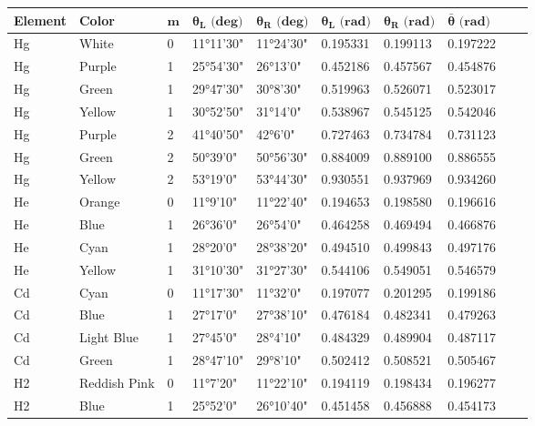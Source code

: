\documentclass[a4paper,11pt]{article}
\begin{document}
\begin{table}[H]
  \centering
  \begin{tabular}{llllllllll}
  \toprule
  \textbf{Element} & \textbf{Color} & \(\boldsymbol{m}\) & \(\boldsymbol{\theta_L \text{ (deg)}}\) & \(\boldsymbol{\theta_R \text{ (deg)}}\) & \(\boldsymbol{\theta_L \text{ (rad)}}\) & \(\boldsymbol{\theta_R \text{ (rad)}}\) & \(\boldsymbol{\bar \theta \text{ (rad)}}\) \\
  \midrule
  Hg  & White        & 0 & 11°11'30" & 11°24'30"  & 0.195331 & 0.199113 & 0.197222 \\
  Hg  & Purple       & 1 & 25°54'30" & 26°13'0"   & 0.452186 & 0.457567 & 0.454876 \\
  Hg  & Green        & 1 & 29°47'30" & 30°8'30"   & 0.519963 & 0.526071 & 0.523017 \\
  Hg  & Yellow       & 1 & 30°52'50" & 31°14'0"   & 0.538967 & 0.545125 & 0.542046 \\
  Hg  & Purple       & 2 & 41°40'50" & 42°6'0"    & 0.727463 & 0.734784 & 0.731123 \\
  Hg  & Green        & 2 & 50°39'0"  & 50°56'30"  & 0.884009 & 0.889100 & 0.886555 \\
  Hg  & Yellow       & 2 & 53°19'0"  & 53°44'30"  & 0.930551 & 0.937969 & 0.934260 \\
  \hline
  He  & Orange       & 0 & 11°9'10"  & 11°22'40"  & 0.194653 & 0.198580 & 0.196616 \\
  He  & Blue       & 1 & 26°36'0"  & 26°54'0"   & 0.464258 & 0.469494 & 0.466876 \\
  He  & Cyan        & 1 & 28°20'0"  & 28°38'20"  & 0.494510 & 0.499843 & 0.497176 \\
  He  & Yellow       & 1 & 31°10'30" & 31°27'30"  & 0.544106 & 0.549051 & 0.546579 \\
  \hline
  Cd  & Cyan        & 0 & 11°17'30" & 11°32'0"   & 0.197077 & 0.201295 & 0.199186 \\
  Cd  & Blue    & 1 & 27°17'0"  & 27°38'10"  & 0.476184 & 0.482341 & 0.479263 \\
  Cd  & Light Blue   & 1 & 27°45'0"  & 28°4'10"   & 0.484329 & 0.489904 & 0.487117 \\
  Cd  & Green        & 1 & 28°47'10" & 29°8'10"   & 0.502412 & 0.508521 & 0.505467 \\
  \hline
  H2  & Reddish Pink & 0 & 11°7'20"  & 11°22'10"  & 0.194119 & 0.198434 & 0.196277 \\
  H2  & Blue    & 1 & 25°52'0"  & 26°10'40"  & 0.451458 & 0.456888 & 0.454173 \\

\end{tabular}
\end{table}
\end{document}
